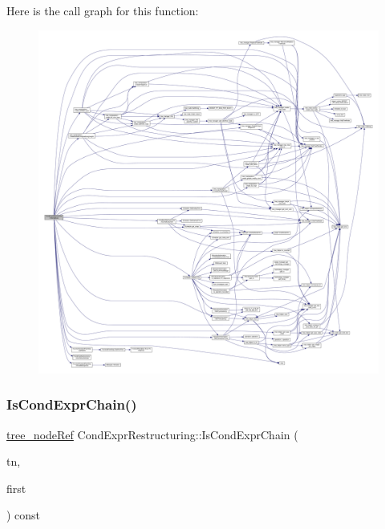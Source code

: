 Here is the call graph for this function\+:
\nopagebreak
\begin{figure}[H]
\begin{center}
\leavevmode
\includegraphics[width=350pt]{dd/d33/classCondExprRestructuring_aae99125cadd764e66ff2566f4942ecb2_cgraph}
\end{center}
\end{figure}
\mbox{\label{classCondExprRestructuring_adc2b20c01958cd9200e7da26103220ee}} 
\subsubsection{\texorpdfstring{Is\+Cond\+Expr\+Chain()}{IsCondExprChain()}}
{\footnotesize\ttfamily \hyperlink{tree__node_8hpp_a6ee377554d1c4871ad66a337eaa67fd5}{tree\+\_\+node\+Ref} Cond\+Expr\+Restructuring\+::\+Is\+Cond\+Expr\+Chain (\begin{DoxyParamCaption}\item[{const \hyperlink{tree__node_8hpp_a3cf5d02292c940f3892425a5b5fdec3c}{tree\+\_\+node\+Const\+Ref}}]{tn,  }\item[{const bool}]{first }\end{DoxyParamCaption}) const\hspace{0.3cm}{\ttfamily [private]}}



